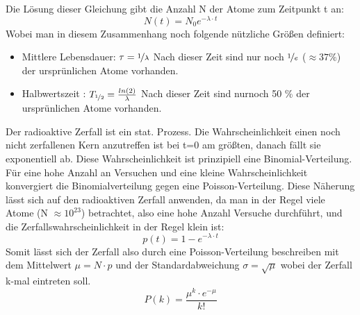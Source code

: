 \documentclass[Ex4_Zusammenfassung.tex]{subfiles}
\begin{document}
\begin{itemize}
Die Lösung dieser Gleichung gibt die Anzahl N der Atome zum Zeitpunkt t an: 
\begin{equation}
N(t) = N_{0} e^{-\lambda \cdot t}
\end{equation}  
Wobei man in diesem Zusammenhang noch folgende nützliche Größen definiert: 
\begin{itemize}
\item Mittlere Lebensdauer: $ \tau = \nicefrac{1}{\lambda} $ \newline 
Nach dieser Zeit sind nur noch $\nicefrac{1}{e} $ ($ \approx 37 \% $) der ursprünlichen Atome vorhanden.
\item Halbwertszeit : $ T_{\nicefrac{1}{2}} = \frac{ln(2)}{\lambda} $
Nach dieser Zeit sind nurnoch 50 \% der ursprünlichen Atome vorhanden.
\end{itemize}
\end{itemize}
Der radioaktive Zerfall ist ein stat. Prozess. Die Wahrscheinlichkeit einen noch nicht zerfallenen Kern anzutreffen ist bei t=0 am größten, danach fällt sie exponentiell ab. 
Diese Wahrscheinlichkeit ist prinzipiell eine Binomial-Verteilung. Für eine hohe Anzahl an Versuchen und eine kleine Wahrscheinlichkeit konvergiert die Binomialverteilung gegen eine Poisson-Verteilung. Diese Näherung lässt sich auf den radioaktiven Zerfall anwenden, da man in der Regel viele Atome (N $\approx 10^{23} $) betrachtet, also eine hohe Anzahl Versuche durchführt, und die Zerfallswahrscheinlichkeit in der Regel klein ist: 
\begin{equation}
p(t) = 1 - e^{-\lambda \cdot t} 
\end{equation}
Somit lässt sich der Zerfall also durch eine Poisson-Verteilung beschreiben mit dem Mittelwert $ \mu = N\cdot p $ und der Standardabweichung  $ \sigma = \sqrt{\mu} $ wobei der Zerfall k-mal eintreten soll. 
\begin{equation}
P(k) = \frac{\mu^k \cdot e^{-\mu} } {k!} 
\end{equation}
\end{document}
